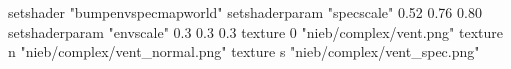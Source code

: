 setshader "bumpenvspecmapworld"
setshaderparam "specscale" 0.52 0.76 0.80
setshaderparam "envscale"  0.3 0.3 0.3
    texture 0 "nieb/complex/vent.png"
    texture n "nieb/complex/vent_normal.png"
    texture s "nieb/complex/vent_spec.png"